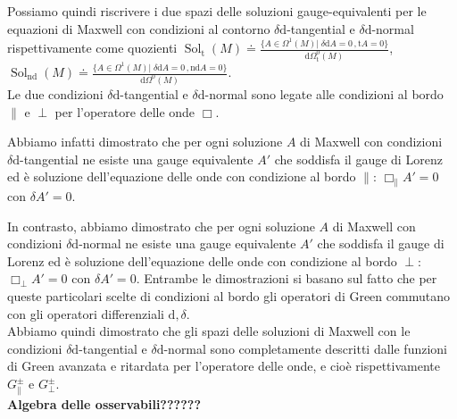 \documentclass[11pt,a4paper]{article}
\begin{document}
	Possiamo quindi riscrivere i due spazi delle soluzioni gauge-equivalenti per le equazioni di Maxwell con condizioni al contorno $\delta\mathrm{d}$-tangential e $\delta\mathrm{d}$-normal rispettivamente come quozienti $\displaystyle\operatorname{Sol}_{\mathrm{t}}(M)\doteq
	\frac{\lbrace A\in\Omega^1(M)|\;\delta\mathrm{d}A=0\,,\mathrm{t}A=0\rbrace}{\mathrm{d}\Omega^{0}_{\mathrm{t}}(M)}$, $\displaystyle\operatorname{Sol}_{\mathrm{nd}}(M)\doteq
	\frac{\lbrace A\in\Omega^1(M)|\;\delta\mathrm{d}A=0\,,\mathrm{nd}A=0\rbrace}{\mathrm{d}\Omega^{0}(M)}$.\\
	
	Le due condizioni $\delta\mathrm{d}$-tangential e $\delta\mathrm{d}$-normal sono legate alle condizioni al bordo $\parallel$ e $\perp$ per l'operatore delle onde $\Box$.
	
	Abbiamo infatti dimostrato che per ogni soluzione $A$ di Maxwell con condizioni $\delta\mathrm{d}$-tangential ne esiste una gauge equivalente $A'$ che soddisfa il gauge di Lorenz ed è soluzione dell'equazione delle onde con condizione al bordo $\parallel$: $\Box_\parallel A'=0$ con $\delta A'=0$.
	
	In contrasto, abbiamo dimostrato che per ogni soluzione $A$ di Maxwell con condizioni $\delta\mathrm{d}$-normal ne esiste una gauge equivalente $A'$ che soddisfa il gauge di Lorenz ed è soluzione dell'equazione delle onde con condizione al bordo $\perp$: $\Box_\perp A'=0$ con $\delta A'=0$. Entrambe le dimostrazioni si basano sul fatto che per queste particolari scelte di condizioni al bordo gli operatori di Green commutano con gli operatori differenziali $\mathrm{d},\delta$.\\
	
	Abbiamo quindi dimostrato che gli spazi delle soluzioni di Maxwell con le condizioni $\delta\mathrm{d}$-tangential e $\delta\mathrm{d}$-normal sono completamente descritti dalle funzioni di Green avanzata e ritardata per l'operatore delle onde, e cioè rispettivamente $G_\parallel^\pm$ e $G_\perp^\pm$.\\
	
		\textbf{Algebra delle osservabili??????}\\
	
\end{document}
